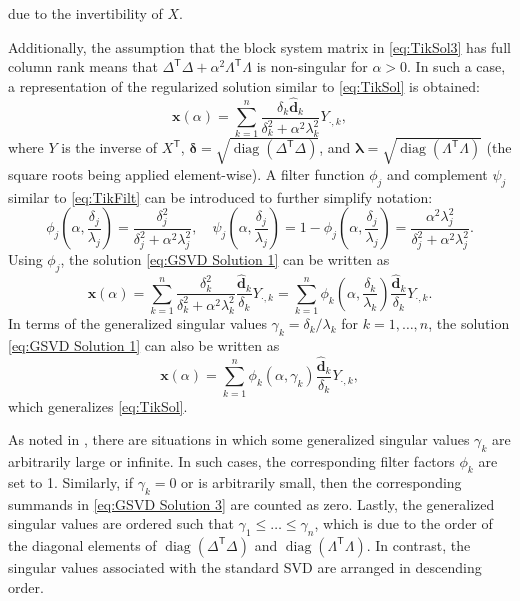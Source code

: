 \documentclass[12pt]{article}
\newcommand{\dVec}{\mathbf{d}}	%
\newcommand{\xVec}{\mathbf{x}}	%
\newcommand{\trans}[1]{{#1}^\mathsf{T}}	%
\DeclareMathOperator{\diag}{diag}	%
\newcommand{\regparam}{\alpha}  %
\newcommand{\filt}{\phi}
\newcommand{\mfilt}{\psi}
\newcommand{\svd}[1]{\widehat{#1}}	%
\begin{document}
due to the invertibility of $X$. \par
Additionally, the assumption that the block system matrix in \eqref{eq:TikSol3} has full column rank means that $\trans{\Delta}\Delta + \regparam^2 \trans{\Lambda}\Lambda$ is non-singular for $\regparam > 0$. In such a case, a representation of the regularized solution similar to \eqref{eq:TikSol} is obtained:
\begin{equation}
\label{eq:GSVD Solution 1}
\xVec(\regparam) = \sum_{k = 1}^{n} \frac{\delta_k \svd{\dVec}_k}{\delta^2_k + \regparam^2 \lambda^2_k}Y_{\cdot,k},
\end{equation}
where $Y$ is the inverse of $\trans{X}$, $\bm{\delta} = \sqrt{\diag(\trans{\Delta}\Delta)}$, and $\bm{\lambda} = \sqrt{\diag(\trans{\Lambda}\Lambda)}$ (the square roots being applied element-wise).  A filter function $\filt_j$ and complement $\mfilt_j$ similar to \eqref{eq:TikFilt} can be introduced to further simplify notation:
\begin{equation}
\label{eq:Filter functions}
\filt_j\left(\regparam,\frac{\delta_j}{\lambda_j}\right) = \frac{\delta^2_j}{\delta^2_j + \regparam^2 \lambda^2_j}, \quad \mfilt_j\left(\regparam,\frac{\delta_j}{\lambda_j}\right) = 1 - \filt_j\left(\regparam,\frac{\delta_j}{\lambda_j}\right) = \frac{\regparam^2 \lambda^2_j}{\delta^2_j + \regparam^2 \lambda^2_j}.
\end{equation}
Using $\filt_j$, the solution \eqref{eq:GSVD Solution 1} can be written as
\begin{equation}
\label{eq:GSVD Solution 2}
\xVec(\regparam) = \sum_{k = 1}^{n} \frac{\delta^2_k}{\delta^2_k + \regparam^2 \lambda^2_k} \frac{\svd{\dVec}_k}{\delta_k} Y_{\cdot,k} = \sum_{k = 1}^{n} \filt_k\left(\regparam,\frac{\delta_k}{\lambda_k}\right) \frac{\svd{\dVec}_k}{\delta_k} Y_{\cdot,k}.
\end{equation} 
In terms of the generalized singular values $\gamma_k = \delta_k/\lambda_k$ for $k = 1,\ldots,n$, the solution \eqref{eq:GSVD Solution 1} can also be written as
\begin{equation}
\label{eq:GSVD Solution 3}
\xVec(\regparam) = \sum_{k = 1}^{n} \filt_k\left(\regparam,\gamma_k\right) \frac{\svd{\dVec}_k}{\delta_k} Y_{\cdot,k},
\end{equation}
which generalizes \eqref{eq:TikSol}. \par 
As noted in \cite{ABT}, there are situations in which some generalized singular values $\gamma_k$ are arbitrarily large or infinite. In such cases, the corresponding filter factors $\filt_k$ are set to 1. Similarly, if $\gamma_k = 0$ or is arbitrarily small, then the corresponding summands in \eqref{eq:GSVD Solution 3} are counted as zero. Lastly, the generalized singular values are ordered such that $\gamma_1 \leq \ldots \leq \gamma_n$, which is due to the order of the diagonal elements of $\diag(\trans{\Delta}\Delta)$ and $\diag(\trans{\Lambda}\Lambda)$. In contrast, the singular values associated with the standard SVD are arranged in descending order.
\end{document}
